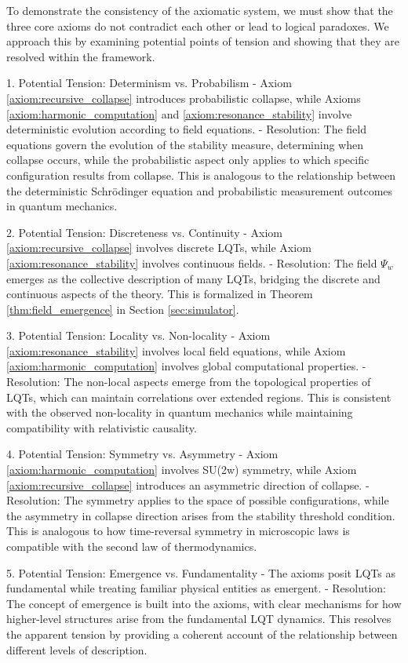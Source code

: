 \documentclass[11pt,a4paper]{article}
\makeatletter
\renewenvironment{proof}[1][\proofname]{\par
  \pushQED{\qed}%
  \normalfont \topsep6\p@\@plus6\p@\relax
  \trivlist
  \item[\hskip\labelsep
        \itshape
    #1\@addpunct{.}]\ignorespaces
}{%
  \popQED\endtrivlist\@endpefalse
}
\makeatother
\begin{document}
\begin{proof}
To demonstrate the consistency of the axiomatic system, we must show that the three core axioms do not contradict each other or lead to logical paradoxes. We approach this by examining potential points of tension and showing that they are resolved within the framework.

1. Potential Tension: Determinism vs. Probabilism
   - Axiom \ref{axiom:recursive_collapse} introduces probabilistic collapse, while Axioms \ref{axiom:harmonic_computation} and \ref{axiom:resonance_stability} involve deterministic evolution according to field equations.
   - Resolution: The field equations govern the evolution of the stability measure, determining when collapse occurs, while the probabilistic aspect only applies to which specific configuration results from collapse. This is analogous to the relationship between the deterministic Schrödinger equation and probabilistic measurement outcomes in quantum mechanics.

2. Potential Tension: Discreteness vs. Continuity
   - Axiom \ref{axiom:recursive_collapse} involves discrete LQTs, while Axiom \ref{axiom:resonance_stability} involves continuous fields.
   - Resolution: The field $\Psi_w$ emerges as the collective description of many LQTs, bridging the discrete and continuous aspects of the theory. This is formalized in Theorem \ref{thm:field_emergence} in Section \ref{sec:simulator}.

3. Potential Tension: Locality vs. Non-locality
   - Axiom \ref{axiom:resonance_stability} involves local field equations, while Axiom \ref{axiom:harmonic_computation} involves global computational properties.
   - Resolution: The non-local aspects emerge from the topological properties of LQTs, which can maintain correlations over extended regions. This is consistent with the observed non-locality in quantum mechanics while maintaining compatibility with relativistic causality.

4. Potential Tension: Symmetry vs. Asymmetry
   - Axiom \ref{axiom:harmonic_computation} involves SU(2w) symmetry, while Axiom \ref{axiom:recursive_collapse} introduces an asymmetric direction of collapse.
   - Resolution: The symmetry applies to the space of possible configurations, while the asymmetry in collapse direction arises from the stability threshold condition. This is analogous to how time-reversal symmetry in microscopic laws is compatible with the second law of thermodynamics.

5. Potential Tension: Emergence vs. Fundamentality
   - The axioms posit LQTs as fundamental while treating familiar physical entities as emergent.
   - Resolution: The concept of emergence is built into the axioms, with clear mechanisms for how higher-level structures arise from the fundamental LQT dynamics. This resolves the apparent tension by providing a coherent account of the relationship between different levels of description.


\end{proof}
\end{document}
